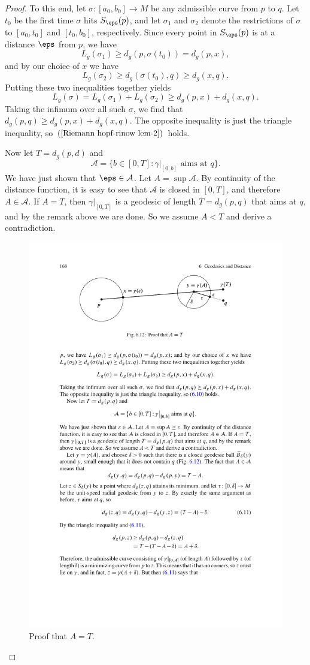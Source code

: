 \begin{proof}
To this end, let $\sigma:[a_0,b_0]\to M$ be any admissible curve from $p$ to $q$. Let $t_0$ be the first time $\sigma$ hits $S_\eps(p)$, and let $\sigma_1$ and $\sigma_2$ 
denote the restrictions of $\sigma$ to $[a_0,t_0]$ and $[t_0,b_0]$, respectively. Since every point in $S_\eps(p)$ is at a distance $\eps$ from $p$, we have 
\[L_g(\sigma_1)\geq d_g(p,\sigma(t_0))=d_g(p,x),\]
and by our choice of $x$ we have
\[L_g(\sigma_2)\geq d_g(\sigma(t_0),q)\geq d_g(x,q).\]
Putting these two inequalities together yields
\[L_g(\sigma)=L_g(\sigma_1)+L_g(\sigma_2)\geq d_g(p,x)+d_g(x,q).\]
Taking the infimum over all such $\sigma$, we find that $d_g(p,q)\geq d_g(p,x)+d_g(x,q)$. The opposite inequality is just the triangle inequality, so $(\ref{Riemann hopf-rinow lem-2})$ 
holds.\par
Now let $T=d_g(p,d)$ and
\[\mathcal{A}=\{b\in[0,T]:\text{$\gamma|_{[0,b]}$ aims at $q$}\}.\]
We have just shown that $\eps\in\mathcal{A}$. Let $A=\sup\mathcal{A}$. By continuity of the distance function, it is easy to see that $\mathcal{A}$ is closed in $[0,T]$, and 
therefore $A\in\mathcal{A}$. If $A=T$, then $\gamma|_{[0,T]}$ is a geodesic of length $T=d_g(p,q)$ that aims at $q$, and by the remark above we are done. So we assume 
$A<T$ and derive a contradiction.
\begin{figure}[htbp]
\centering
\includegraphics{pictures/Hopf-Rinow-lem-2}
\caption{Proof that $A=T$.}
\end{figure}


\end{proof}
